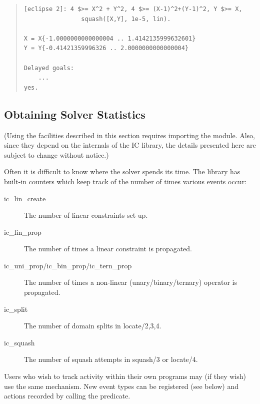 \begin{quote}
\begin{verbatim}
[eclipse 2]: 4 $>= X^2 + Y^2, 4 $>= (X-1)^2+(Y-1)^2, Y $>= X,
                squash([X,Y], 1e-5, lin).

X = X{-1.0000000000000004 .. 1.4142135999632601}
Y = Y{-0.41421359996326 .. 2.0000000000000004}

Delayed goals:
    ...
yes.
\end{verbatim}
\end{quote}

\subsection{Obtaining Solver Statistics}

(Using the facilities described in this section requires importing the
 module.  Also, since
they depend on the internals of the IC library, the details presented here
are subject to change without notice.)

Often it is difficult to know where the solver spends its time.
The library has built-in counters which keep track of the number of times
various events occur:
\begin{description}
    \item[ic_lin_create]
	The number of linear constraints set up.
    \item[ic_lin_prop]
	The number of times a linear constraint is propagated.
    \item[ic_uni_prop/ic_bin_prop/ic_tern_prop]
	The number of times a non-linear (unary/binary/ternary) operator is
	propagated.
    \item[ic_split]
	The number of domain splits in locate/2,3,4.
    \item[ic_squash]
	The number of squash attempts in squash/3 or locate/4.
\end{description}

Users who wish to track activity within their own programs may (if they
wish) use the same mechanism.  New event types can be registered (see
below) and actions recorded by calling the
predicate.

